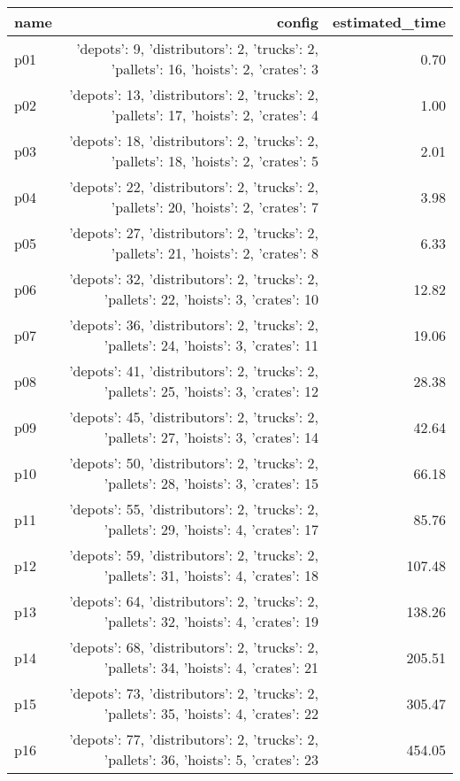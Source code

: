 \documentclass{article}
\begin{document}
                            \begin{center}
                            \scriptsize
                            \begin{tabular}{@{}l|r|r@{}}
                            name & config & estimated\_time\\\midrule
                              p01&{'depots': 9, 'distributors': 2, 'trucks': 2, 'pallets': 16, 'hoists': 2, 'crates': 3}&0.70\\
  p02&{'depots': 13, 'distributors': 2, 'trucks': 2, 'pallets': 17, 'hoists': 2, 'crates': 4}&1.00\\
  p03&{'depots': 18, 'distributors': 2, 'trucks': 2, 'pallets': 18, 'hoists': 2, 'crates': 5}&2.01\\
  p04&{'depots': 22, 'distributors': 2, 'trucks': 2, 'pallets': 20, 'hoists': 2, 'crates': 7}&3.98\\
  p05&{'depots': 27, 'distributors': 2, 'trucks': 2, 'pallets': 21, 'hoists': 2, 'crates': 8}&6.33\\
  p06&{'depots': 32, 'distributors': 2, 'trucks': 2, 'pallets': 22, 'hoists': 3, 'crates': 10}&12.82\\
  p07&{'depots': 36, 'distributors': 2, 'trucks': 2, 'pallets': 24, 'hoists': 3, 'crates': 11}&19.06\\
  p08&{'depots': 41, 'distributors': 2, 'trucks': 2, 'pallets': 25, 'hoists': 3, 'crates': 12}&28.38\\
  p09&{'depots': 45, 'distributors': 2, 'trucks': 2, 'pallets': 27, 'hoists': 3, 'crates': 14}&42.64\\
  p10&{'depots': 50, 'distributors': 2, 'trucks': 2, 'pallets': 28, 'hoists': 3, 'crates': 15}&66.18\\
  p11&{'depots': 55, 'distributors': 2, 'trucks': 2, 'pallets': 29, 'hoists': 4, 'crates': 17}&85.76\\
  p12&{'depots': 59, 'distributors': 2, 'trucks': 2, 'pallets': 31, 'hoists': 4, 'crates': 18}&107.48\\
  p13&{'depots': 64, 'distributors': 2, 'trucks': 2, 'pallets': 32, 'hoists': 4, 'crates': 19}&138.26\\
  p14&{'depots': 68, 'distributors': 2, 'trucks': 2, 'pallets': 34, 'hoists': 4, 'crates': 21}&205.51\\
  p15&{'depots': 73, 'distributors': 2, 'trucks': 2, 'pallets': 35, 'hoists': 4, 'crates': 22}&305.47\\
  p16&{'depots': 77, 'distributors': 2, 'trucks': 2, 'pallets': 36, 'hoists': 5, 'crates': 23}&454.05\\

\end{tabular}
\end{center}
\end{document}
